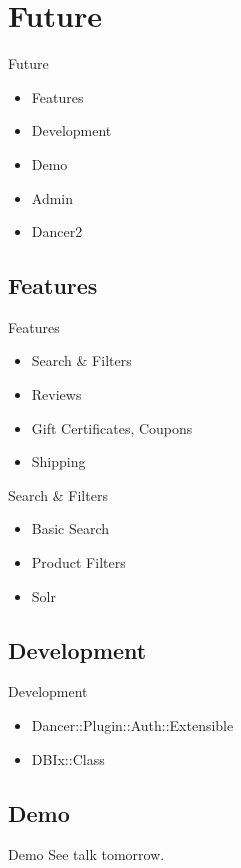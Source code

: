 \section{Future}
\begin{frame}{Future}
\begin{itemize}
\item Features
\item Development
\item Demo
\item Admin
\item Dancer2
\end{itemize}
\end{frame}

\subsection{Features}
\begin{frame}{Features}
\begin{itemize}
\item Search \&  Filters
\item Reviews
\item Gift Certificates, Coupons
\item Shipping
\end{itemize}
\end{frame}

\begin{frame}{Search \&  Filters}
\begin{itemize}
\item Basic Search
\item Product Filters
\item Solr
\end{itemize}
\end{frame}

\subsection{Development}
\begin{frame}{Development}
\begin{itemize}
\item Dancer::Plugin::Auth::Extensible
\item DBIx::Class
\end{itemize}
\end{frame}

\subsection{Demo}
\begin{frame}{Demo}
See talk tomorrow.
\end{frame}


